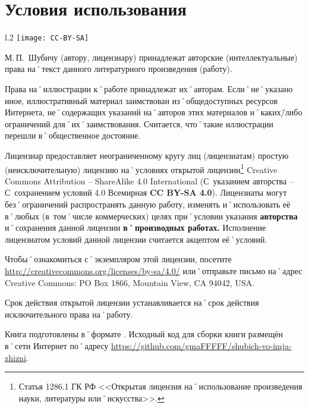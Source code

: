 ﻿%
\chapter{Условия использования}

\begin{wrapfigure}{l}{.2\textwidth}
\centering
\texttt{[image: CC-BY-SA]}
\label{fig:CC-BY-SA}
\end{wrapfigure}

\noindent М.\,П.~Шубичу (автору, лицензиару) принадлежат авторские (интеллектуальные) права на˚текст данного литературного произведения (работу). 

\noindent Права на˚иллюстрации к˚работе принадлежат их˚авторам. Если˚не˚указано иное, иллюстративный материал заимствован из˚общедоступных ресурсов Интернета, не˚содержащих указаний на˚авторов этих материалов и˚каких\=/либо ограничений для˚их˚заимствования. Считается, что˚такие иллюстрации перешли в˚общественное достояние.

Лицензиар предоставляет неограниченному кругу лиц (лицензиатам) простую (неисключительную) лицензию на˚условиях открытой лицензии\footnote
{Статья 1286.1 ГК РФ <<Открытая лицензия на˚использование произведения науки, литературы или˚искусства>>.}
Creative Commons Attribution \--- ShareAlike 4.0 International (С~указанием авторства \--- С~сохранением условий 4.0 Всемирная \textbf{CC BY-SA 4.0}). Лицензиаты могут без˚ограничений распространять данную работу, изменять и˚использовать её в˚любых (в~том˚числе коммерческих) целях при˚условии указания \textbf{авторства} и˚сохранения данной лицензии \textbf{в˚производных работах.}
Исполнение лицензиатом условий данной лицензии считается акцептом её˚условий.

Чтобы˚ознакомиться с˚экземпляром этой лицензии, посетите \url{http://creativecommons.org/licenses/by-sa/4.0/} или˚отправьте письмо на˚адрес Creative Commons: PO Box 1866, Mountain View, CA 94042, USA.{\sloppy

}%

Срок действия открытой лицензии устанавливается на˚срок действия исключительного права на˚работу.

Книга подготовлены в˚формате \LaTeXe{}. Исходный код для сборки книги размещён в˚сети Интернет по˚адресу \url{https://github.com/gmaFFFFF/shubich-vo-imja-zhizni}.{\sloppy

}